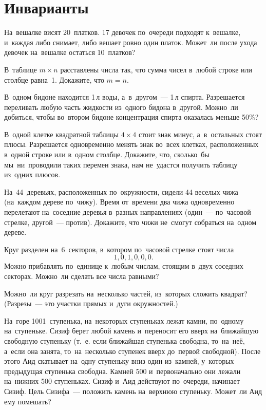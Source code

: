 
\section*{Инварианты}



\begin{problems}

\item
На~вешалке висят 20~платков.
17 девочек по~очереди подходят к~вешалке, и~каждая либо снимает, либо вешает
ровно один платок.
Может~ли после ухода девочек на~вешалке остаться 10~платков?

\item
В~таблице $m \times n$ расставлены числа так, что сумма чисел в~любой строке
или столбце равна~1.
Докажите, что $m = n$.

\item
В~одном бидоне находится 1\,л воды, а~в~другом~--- 1\,л спирта.
Разрешается переливать любую часть жидкости из~одного бидона в~другой.
Можно~ли добиться, чтобы во~втором бидоне концентрация спирта оказалась меньше
50\%?

\item
В~одной клетке квадратной таблицы $4 \times 4$ стоит знак минус, а~в~остальных
стоят плюсы.
Разрешается одновременно менять знак во~всех клетках, расположенных в~одной
строке или в~одном столбце.
Докажите, что, сколько~бы мы~ни~проводили таких перемен знака, нам не~удастся
получить таблицу из~одних плюсов.

\item
На~44~деревьях, расположенных по~окружности, сидели 44 веселых чижа
(на~каждом дереве по~чижу).
Время от~времени два чижа одновременно перелетают на~соседние деревья в~разных
направлениях (один~--- по~часовой стрелке, другой~--- против).
Докажите, что чижи не~смогут собраться на~одном дереве.

\item
Круг разделен на~6~секторов, в~котором по~часовой стрелке стоят числа
\[1, 0, 1, 0, 0, 0.\]
Можно прибавлять по~единице к~любым числам, стоящим в~двух соседних секторах.
Можно~ли сделать все числа равными?

\item
Можно~ли круг разрезать на~несколько частей, из~которых сложить квадрат?
(Разрезы~--- это участки прямых и~дуги окружностей.)

\item
На~горе 1001~ступенька, на~некоторых ступеньках лежат камни, по~одному
на~ступеньке.
Сизиф берет любой камень и~переносит его вверх на~ближайшую свободную ступеньку
(т.~е. если ближайшая ступенька свободна, то~на~неё, а~если она занята,
то~на~несколько ступенек вверх до~первой свободной).
После этого Аид скатывает на~одну ступеньку вниз один из~камней, у~которых
предыдущая ступенька свободна.
Камней 500 и~первоначально они лежали на~нижних 500 ступеньках.
Сизиф и~Аид действуют по~очереди, начинает Сизиф.
Цель Сизифа~--- положить камень на~верхнюю ступеньку.
Может~ли Аид ему помешать?

\end{problems}

